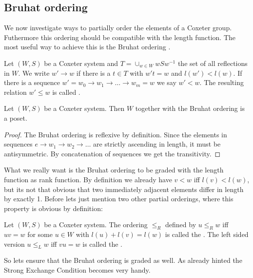 \subsection{Bruhat ordering}
\label{bruhat-ordering}

We now investigate ways to partially order the elements of a Coxeter group. Futhermore this ordering should be compatible with the length function. The most useful way to achieve this is the Bruhat ordering \cite[Section 5.9]{humphreys:coxeter}.

\begin{defi}
	Let $(W,S)$ be a Coxeter system and $T = \cup_{w \in W} wSw^{-1}$ the set of all reflections in $W$. We write $w' \to w$ if there is a $t \in T$ with $w't = w$ and $l(w') < l(w)$. If there is a sequence $w' = w_0 \to w_1 \to \ldots \to w_m = w$ we say $w' < w$. The resulting relation $w' \leq w$ is called .
\end{defi}

\begin{lemm}
	Let $(W,S)$ be a Coxeter system. Then $W$ together with the Bruhat ordering is a poset.

	\begin{proof}
		The Bruhat ordering is reflexive by definition. Since the elements in sequences $e \to w_1 \to w_2 \to \ldots$ are strictly ascending in length, it must be antisymmetric. By concatenation of sequences we get the transitivity.
	\end{proof}
\end{lemm}

What we really want is the Bruhat ordering to be graded with the length function as rank function. By definition we already have $v < w$ iff $l(v) < l(w)$, but its not that obvious that two immediately adjacent elements differ in length by exactly 1. Before lets just mention two other partial orderings, where this property is obvious by definition:

\begin{defi}
	Let $(W,S)$ be a Coxeter system. The ordering $\leq_R$ defined by $u \leq_R w$ iff $uv = w$ for some $u \in W$ with $l(u) + l(v) = l(w)$ is called the . The left sided version $u \leq_L w$ iff $vu = w$ is called the .
\end{defi}

So lets ensure that the Bruhat ordering is graded as well. As already hinted the Strong Exchange Condition becomes very handy.